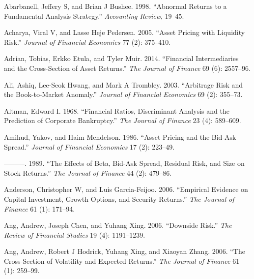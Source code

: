 \documentclass[
  letterpaper,
  DIV=11,
  numbers=noendperiod]{scrreprt}
\newlength{\cslhangindent}
\newlength{\cslentryspacingunit} %
\newenvironment{CSLReferences}[2] %
 {%
  \setlength{\parindent}{0pt}
  \ifodd #1
  \let\oldpar\par
  \def\par{\hangindent=\cslhangindent\oldpar}
  \fi
  \setlength{\parskip}{#2\cslentryspacingunit}
 }%
 {}
\begin{document}
\hypertarget{refs}{}
\begin{CSLReferences}{1}{0}
\leavevmode{}%
Abarbanell, Jeffery S, and Brian J Bushee. 1998. {``Abnormal Returns to
a Fundamental Analysis Strategy.''} \emph{Accounting Review}, 19--45.

\leavevmode{}%
Acharya, Viral V, and Lasse Heje Pedersen. 2005. {``Asset Pricing with
Liquidity Risk.''} \emph{Journal of Financial Economics} 77 (2):
375--410.

\leavevmode{}%
Adrian, Tobias, Erkko Etula, and Tyler Muir. 2014. {``Financial
Intermediaries and the Cross-Section of Asset Returns.''} \emph{The
Journal of Finance} 69 (6): 2557--96.

\leavevmode{}%
Ali, Ashiq, Lee-Seok Hwang, and Mark A Trombley. 2003. {``Arbitrage Risk
and the Book-to-Market Anomaly.''} \emph{Journal of Financial Economics}
69 (2): 355--73.

\leavevmode{}%
Altman, Edward I. 1968. {``Financial Ratios, Discriminant Analysis and
the Prediction of Corporate Bankruptcy.''} \emph{The Journal of Finance}
23 (4): 589--609.

\leavevmode{}%
Amihud, Yakov, and Haim Mendelson. 1986. {``Asset Pricing and the
Bid-Ask Spread.''} \emph{Journal of Financial Economics} 17 (2):
223--49.

\leavevmode{}%
---------. 1989. {``The Effects of Beta, Bid-Ask Spread, Residual Risk,
and Size on Stock Returns.''} \emph{The Journal of Finance} 44 (2):
479--86.

\leavevmode{}%
Anderson, Christopher W, and Luis Garcia-Feijoo. 2006. {``Empirical
Evidence on Capital Investment, Growth Options, and Security Returns.''}
\emph{The Journal of Finance} 61 (1): 171--94.

\leavevmode{}%
Ang, Andrew, Joseph Chen, and Yuhang Xing. 2006. {``Downside Risk.''}
\emph{The Review of Financial Studies} 19 (4): 1191--1239.

\leavevmode{}%
Ang, Andrew, Robert J Hodrick, Yuhang Xing, and Xiaoyan Zhang. 2006.
{``The Cross-Section of Volatility and Expected Returns.''} \emph{The
Journal of Finance} 61 (1): 259--99.


\end{CSLReferences}
\end{document}
